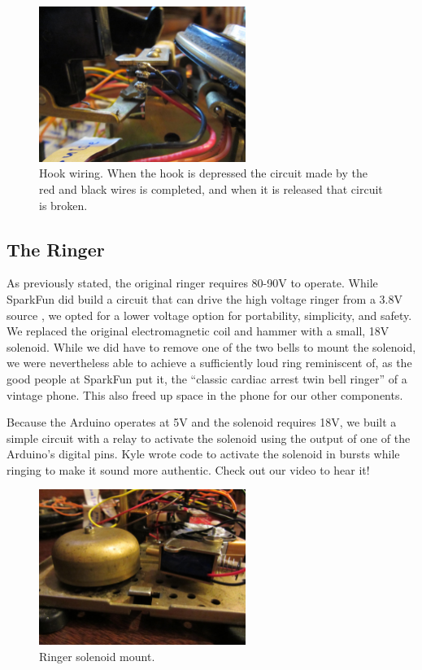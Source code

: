 \documentclass{es50report}
\begin{document}
    \begin{figure}
        \centering
        \includegraphics[width=0.6\textwidth, clip=true, trim=200 50 200 70]{images/small/hookWiring}
        \caption{Hook wiring. When the hook is depressed the circuit made by the red and black wires is completed, and when it is released that circuit is broken.}\label{fig:hookWiring}
    \end{figure}

    \subsection{The Ringer}
    As previously stated, the original ringer requires 80-90V to operate. While SparkFun did build a circuit that can drive the high voltage ringer from a 3.8V source \cite{pete05}, we opted for a lower voltage option for portability, simplicity, and safety. We replaced the original electromagnetic coil and hammer with a small, 18V solenoid. While we did have to remove one of the two bells to mount the solenoid, we were nevertheless able to achieve a sufficiently loud ring reminiscent of, as the good people at SparkFun put it, the  ``classic cardiac arrest twin bell ringer'' of a vintage phone. This also freed up space in the phone for our other components.

    Because the Arduino operates at 5V and the solenoid requires 18V, we built a simple circuit with a relay to activate the solenoid using the output of one of the Arduino's digital pins. Kyle wrote code to activate the solenoid in bursts while ringing to make it sound more authentic. Check out our video to hear it!

    \begin{figure}
        \centering
        \includegraphics[width=0.6\textwidth, clip=true, trim=0 450 0 0]{images/small/solenoidMount}
        \caption{Ringer solenoid mount.}\label{fig:solenoidMount}
    \end{figure}
\end{document}
